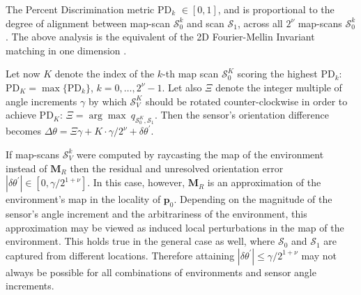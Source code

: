 The Percent Discrimination metric PD$_k$ $\in [0,1]$, and is proportional to
the degree of alignment between map-scan $\mathcal{S}_0^k$ and
scan $\mathcal{S}_1$, across all $2^\nu$ map-scans $\mathcal{S}_0^k$.
The above analysis is the equivalent of the 2D Fourier-Mellin Invariant
matching in one dimension \cite{fmt2d}.

Let now $K$ denote the index of the $k$-th map scan
$\mathcal{S}_0^K$ scoring the highest PD$_k$: $\text{PD}_K =
\max \{\text{PD}_k\}$, $k = 0,\dots,2^\nu-1$. Let also $\Xi$ denote the integer
multiple of angle increments $\gamma$ by which $\mathcal{S}_V^K$
should be rotated counter-clockwise in order to achieve PD$_K$:
$\Xi = \arg\max\ q_{\mathcal{S}_0^K, \mathcal{S}_1}$.  Then the sensor's
orientation difference becomes
$\Delta\theta = \Xi\gamma + K \cdot \gamma/2^\nu + \delta\theta^\prime$.

If map-scans $\mathcal{S}_V^k$ were computed by raycasting the map of the
environment instead of $\bm{M}_R$ then the residual and unresolved orientation
error $|\delta\theta^\prime| \in [0,\gamma / 2^{1+\nu}]$. In this case, however,
$\bm{M}_R$ is an approximation of the environment's map in the locality of
$\bm{p}_0$. Depending on the magnitude of the sensor's angle increment and
the arbitrariness of the environment, this approximation may be viewed as
induced local perturbations in the map of the environment. This holds true
in the general case as well, where $\mathcal{S}_0$ and $\mathcal{S}_1$ are
captured from different locations. Therefore attaining
$|\delta\theta^\prime| \leq \gamma / 2^{1+\nu}$ may not always be possible
for all combinations of environments and sensor angle increments.
